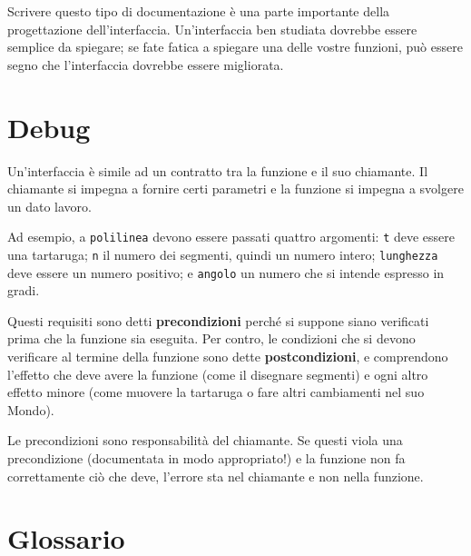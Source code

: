 \documentclass[10pt]{book}
\begin{document}
Scrivere questo tipo di documentazione è una parte importante della progettazione dell'interfaccia. Un'interfaccia ben studiata dovrebbe essere semplice da spiegare; se fate fatica a spiegare una delle vostre funzioni, può essere segno che l'interfaccia dovrebbe essere migliorata.


\section{Debug}

Un'interfaccia è simile ad un contratto tra la funzione e il suo chiamante. Il chiamante si impegna a fornire certi parametri e la funzione si impegna a svolgere un dato lavoro.

Ad esempio, a {\tt polilinea} devono essere passati quattro argomenti: {\tt t} deve essere una tartaruga; {\tt n} il numero dei segmenti, quindi un numero intero; {\tt lunghezza} deve essere un numero positivo; e {\tt angolo} un numero che si intende espresso in gradi.

Questi requisiti sono detti {\bf precondizioni} perché si suppone siano verificati prima che la funzione sia eseguita. Per contro, le condizioni che si devono verificare al termine della funzione sono dette {\bf postcondizioni},  e comprendono l'effetto che deve avere la funzione (come il disegnare segmenti) e ogni altro effetto minore (come muovere la tartaruga o fare altri cambiamenti nel suo Mondo).

Le precondizioni sono responsabilità del chiamante. Se questi viola una precondizione (documentata in modo appropriato!) e la funzione non fa correttamente ciò che deve, l'errore sta nel chiamante e non nella funzione.



\section{Glossario}
\end{document}
